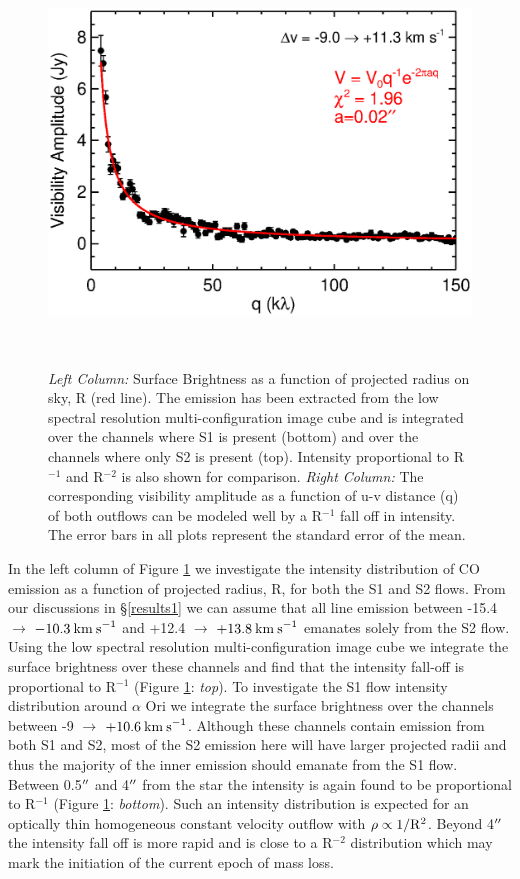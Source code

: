 \documentclass[iop]{emulateapj}
\begin{document}
\begin{figure}[hbt!]
{          \includegraphics[scale=0.50]{f17.eps}

          }
\\
\caption{\textit{Left Column:} Surface Brightness as a function of projected radius on sky, R (red line). The emission has been extracted from the low spectral resolution multi-configuration image cube and is integrated over the channels where S1 is present (bottom) and over the channels where only S2 is present (top). Intensity proportional to R${}^{-1}$ and R${}^{-2}$ is also shown for comparison. \textit{Right Column:} The corresponding visibility amplitude as a function of u-v distance (q) of both outflows can be modeled well by a R${}^{-1}$ fall off in intensity. The error bars in all plots represent the standard error of the mean.}
\label{fig:fig6}
\end{figure}

In the left column of Figure \ref{fig:fig6} we investigate the intensity distribution of CO emission as a function of projected radius, R, for both the S1 and S2 flows. From our discussions in \S \ref{results1} we can assume that all line emission between -15.4 $\rightarrow$ $-10.3\>{\rm km\>s}^{-1}$ and +12.4 $\rightarrow$ $+13.8\>{\rm km\>s}^{-1}$ emanates solely from the S2 flow. Using the low spectral resolution multi-configuration image cube we integrate the surface brightness over these channels and find that the intensity fall-off is proportional to R${}^{-1}$ (Figure \ref{fig:fig6}: \textit{top}). To investigate the S1 flow intensity distribution around $\alpha$ Ori we integrate the surface brightness over the channels between -9 $\rightarrow$ $+10.6\>{\rm km\>s}^{-1}$. Although these channels contain emission from both S1 and S2, most of the S2 emission here will have larger projected radii and thus the majority of the inner emission should emanate from the S1 flow.  Between 0.5$\mbox{$^{\prime\prime}$}$ and 4$\mbox{$^{\prime\prime}$}$ from the star the intensity is again found to be proportional to R${}^{-1}$ (Figure \ref{fig:fig6}: \textit{bottom}). Such an intensity distribution is expected for an optically thin homogeneous constant velocity outflow with $\rho \propto 1/\rm{R^{2}}$. Beyond 4$\mbox{$^{\prime\prime}$}$ the intensity fall off is more rapid and is close to a R${}^{-2}$ distribution which may mark the initiation of the current epoch of mass loss.
\end{document}
